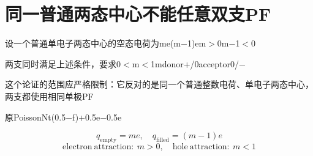\documentclass[11pt,a4paper]{article}
\begin{document}
\section{{\cjkfont 同一普通两态中心不能任意双支}\allowbreak{}PF}\label{sec:17}
{\cjkfont 设一个普通单电子两态中心的空态电荷为}\allowbreak{}me\allowbreak{}(m−1)e\allowbreak{}m\ensuremath{>}0\allowbreak{}m−1\ensuremath{<}0\allowbreak{}
\par
{\cjkfont 两支同时满足上述条件，要求}\allowbreak{}0\ensuremath{<}m\ensuremath{<}1\allowbreak{}m\allowbreak{}donor\allowbreak{}+/0\allowbreak{}acceptor\allowbreak{}0/−\allowbreak{}
\par
{\cjkfont 这个论证的范围应严格限制：它反对的是同一个普通整数电荷、单电子两态中心，两支都使用相同单极}\allowbreak{}PF\allowbreak{}
\par
{\cjkfont 原}\allowbreak{}Poisson\allowbreak{}Nt(0.5−f)\allowbreak{}+0.5e\allowbreak{}−0.5e\allowbreak{}
\par
\begin{equation}
q_{\mathrm{empty}}=me,\quad q_{\mathrm{filled}}=(m-1)e
\label{eq:18}\end{equation}
\begin{equation}
\mathrm{electron\ attraction}:\ m>0,\quad\mathrm{hole\ attraction}:\ m<1
\label{eq:19}\end{equation}
\end{document}
